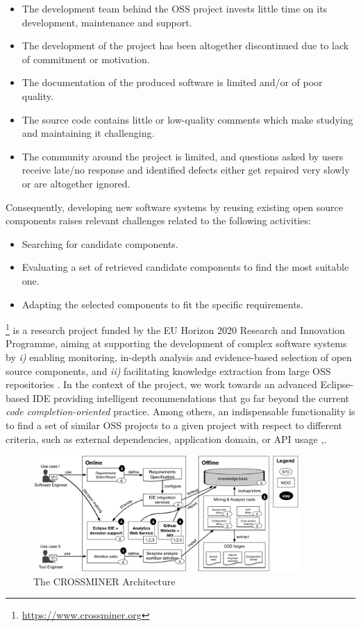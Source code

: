 \begin{itemize}
	\item The development team behind the OSS project invests little time on its development, maintenance and support.
	\item The development of the project has been altogether discontinued due to lack of commitment or motivation.
	\item The documentation of the produced software is limited and/or of poor quality.
	\item The source code contains little or low-quality comments which make studying and maintaining it challenging.
	\item The community around the project is limited, and questions asked by users receive late/no response and identified defects either get repaired very slowly or are altogether ignored.
\end{itemize}

Consequently, developing new software systems by reusing existing open source components raises relevant challenges related to the following activities:

\begin{itemize}
	\item Searching for candidate components.
	\item Evaluating a set of retrieved candidate components to find the most suitable one.
	\item Adapting the selected components to fit the specific requirements.
\end{itemize}

\CROSSMINER\footnote{\url{https://www.crossminer.org}} is a research project funded by the EU Horizon 2020 Research and Innovation Programme, aiming at supporting the development of complex software systems by \textit{i)} enabling monitoring, in-depth analysis and evidence-based selection of open source components, and \textit{ii)} facilitating knowledge extraction from large OSS repositories \cite{10.1007/978-3-319-74730-9_33}. In the context of the project, we work towards an advanced Eclipse-based IDE providing intelligent recommendations that go far beyond the current \emph{code completion-oriented} practice. Among others, an indispensable functionality is to find a set of similar OSS projects to a given project with respect to different criteria, such as external dependencies, application domain, or API usage \cite{DBLP:conf/iir/NDD013},\cite{NDRDSEAA2018}.

\begin{figure}[!h]
	\includegraphics[width=0.9\textwidth]{images/crossminer.png}
	\centering
	\caption{The CROSSMINER Architecture}
	\label{fig:CrossminerApproach}
\end{figure}

